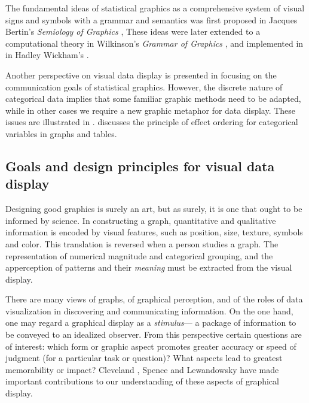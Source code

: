 \documentclass[10pt,krantz2]{krantz}\usepackage[]{graphicx}\usepackage[]{color}
\begin{document}
The fundamental ideas of statistical graphics as a comprehensive system
of visual signs and symbols with a grammar and semantics was first proposed
in Jacques Bertin's \emph{Semiology of Graphics} \citeyearpar{Bertin:83},
These ideas were later extended to a computational theory
in Wilkinson's \emph{Grammar of Graphics} \citeyearpar{Wilkinson:2005},
and implemented in \R in Hadley Wickham's 
\citep{Wickham:2009:ggplot2,ggplot2}.

Another perspective on visual data display is presented in 
focusing on the communication goals of statistical graphics.
However, the discrete nature of categorical data implies that
some familiar graphic methods need to be adapted, while in other
cases we require a new graphic metaphor for data display.
These issues are illustrated in .
 discusses the principle of effect ordering
for categorical variables in graphs and tables.

\subsection{Goals and design principles for visual data display}\label{sec:intro-goals}

Designing good graphics is surely an art, but as surely, it is
one that ought to be informed by science.
In constructing a graph, quantitative and qualitative information is
encoded by visual features, such as position, size, texture, symbols
and color. This translation is reversed when a person studies a
graph. The representation of numerical magnitude and categorical
grouping, and the apperception of patterns and their \emph{meaning} must be extracted from the visual display.

There are many views of graphs, of graphical perception, and of
the roles of data visualization in discovering and communicating
information.
On the one hand, one may regard a graphical display as a \emph{stimulus}---
a package of information to be conveyed to an idealized observer.
From this perspective certain questions are of interest:  which
form or graphic aspect promotes greater accuracy or speed of judgment
(for a particular task or question)?  What aspects lead to greatest
memorability or impact?
Cleveland \citep{ClevelandMcGill:84b,ClevelandMcGill:85,Cleveland:93:JCGS},
Spence and Lewandowsky
\citep{LewandowskySpence:89,Spence:90,SpenceLewandowsky:90} have made important contributions to our understanding of
these aspects of graphical display.
\end{document}
